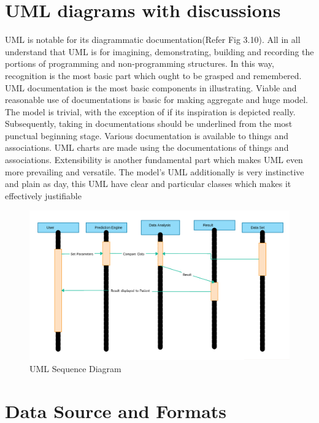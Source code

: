 \documentclass[oneside,12pt]{Classes/VTU}
\begin{document}
	\section{UML diagrams with discussions} 
	UML is notable for its diagrammatic documentation(Refer Fig 3.10). All in all understand that UML is for imagining, demonstrating, building and recording the portions of programming and non-programming structures. In this way, recognition is the most basic part which ought to be grasped and remembered. UML documentation is the most basic components in illustrating. Viable and reasonable use of documentations is basic for making aggregate and huge model. The model is trivial, with the exception of if its inspiration is depicted really. Subsequently, taking in documentations should be underlined from the most punctual beginning stage. Various documentation is available to things and associations. UML charts are made using the documentations of things and associations. Extensibility is another fundamental part which makes UML even more prevailing and versatile. The model's UML additionally is very instinctive and plain as day, this UML have clear and particular classes which makes it effectively justifiable
	\begin{figure}[h]
		\begin{center}
			\includegraphics[width=15cm]{images/uml_diagram.png}
			\caption{UML Sequence Diagram}
		\end{center}
	\end{figure}
	
	
	
	






  	
  	\section{Data Source and Formats}
\end{document}
